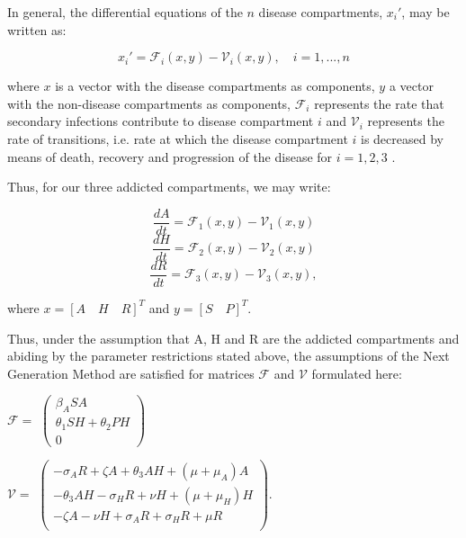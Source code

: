 \documentclass[12pt]{article}
\begin{document}
In general, the differential equations of the $n$ disease compartments, $x_i'$, may be written as: 

\[{x_i'} = \mathscr{F}_{i} (x,y)-\mathscr{V}_i (x,y),\quad i=1,...,n\] 

where $x$ is a vector with the disease compartments as components, $y$ a vector with the non-disease compartments as components, $\mathscr{F}_{i}$ represents the rate that secondary infections contribute to disease compartment $i$ and $\mathscr{V}_{i}$ represents the rate of transitions, i.e. rate at which the disease compartment $i$ is decreased by means of death, recovery and progression of the disease for $i=1,2,3$ \cite{Driessche}. 

Thus, for our three addicted compartments, we may write: 

$$\dfrac{dA}{dt} = \mathscr{F}_{1} (x,y)-\mathscr{V}_{1}(x,y)$$
$$\dfrac{dH}{dt} = \mathscr{F}_{2} (x,y)-\mathscr{V}_{2}(x,y)$$
$$\dfrac{dR}{dt} = \mathscr{F}_{3} (x,y)-\mathscr{V}_{3}(x,y),$$

where $x= {[A\quad H\quad R]}^{T}$ and $y= {[S\quad P]}^{T}$.



Thus, under the assumption that A, H and R are the addicted compartments and abiding by the parameter restrictions stated above, the assumptions of the Next Generation Method are satisfied for matrices $\mathscr{F}$ and $\mathscr{V}$ formulated here:

\begin{center}
$\mathscr{F}=$
$ \begin{pmatrix}

\beta_{A} SA \\
\theta_{1}SH+\theta_{2}PH \\
0
\end{pmatrix}$



$\mathscr{V}=$
$ \begin{pmatrix}

-\sigma_{A}R+\zeta A+\theta_{3} AH + (\mu +\mu_{A})A \\
-\theta_{3}AH-\sigma_{H}R+\nu H +(\mu +\mu_{H}) H \\
-\zeta A -\nu H +\sigma_{A}R +\sigma_{H}R +\mu R\\
\end{pmatrix}$.
\end{center}
\end{document}
